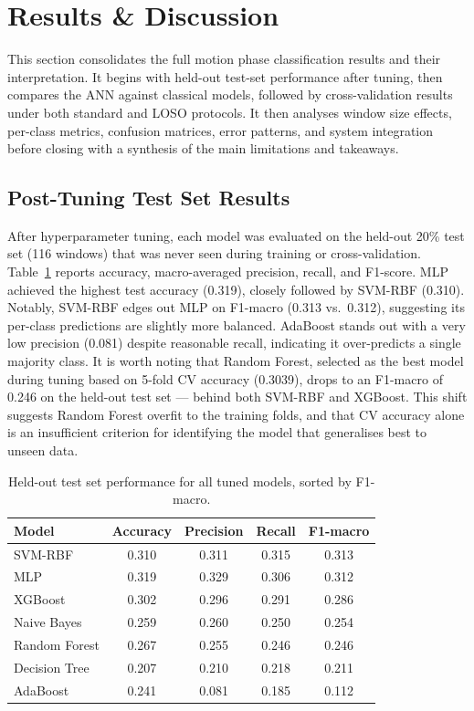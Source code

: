 \documentclass[12pt,a4paper]{cibb}
\begin{document}
\section{Results \& Discussion}
\label{sec:results_discussion}
This section consolidates the full motion phase classification results and their interpretation. It begins with held-out test-set performance after tuning, then compares the ANN against classical models, followed by cross-validation results under both standard and LOSO protocols. It then analyses window size effects, per-class metrics, confusion matrices, error patterns, and system integration before closing with a synthesis of the main limitations and takeaways.

\subsection{Post-Tuning Test Set Results}
After hyperparameter tuning, each model was evaluated on the held-out 20\% test set (116 windows) that was never seen during training or cross-validation. Table~\ref{tab:testresults} reports accuracy, macro-averaged precision, recall, and F1-score. MLP achieved the highest test accuracy (0.319), closely followed by SVM-RBF (0.310). Notably, SVM-RBF edges out MLP on F1-macro (0.313 vs.\ 0.312), suggesting its per-class predictions are slightly more balanced. AdaBoost stands out with a very low precision (0.081) despite reasonable recall, indicating it over-predicts a single majority class. It is worth noting that Random Forest, selected as the best model during tuning based on 5-fold CV accuracy (0.3039), drops to an F1-macro of 0.246 on the held-out test set — behind both SVM-RBF and XGBoost. This shift suggests Random Forest overfit to the training folds, and that CV accuracy alone is an insufficient criterion for identifying the model that generalises best to unseen data.

\begin{table}[H]
\centering
\small
\begin{tabular}{lcccc}
\toprule
\textbf{Model} & \textbf{Accuracy} & \textbf{Precision} & \textbf{Recall} & \textbf{F1-macro} \\
\midrule
\rowcolor{LightBlue} SVM-RBF       & 0.310 & 0.311 & 0.315 & 0.313 \\
MLP           & 0.319 & 0.329 & 0.306 & 0.312 \\
\rowcolor{LightBlue} XGBoost       & 0.302 & 0.296 & 0.291 & 0.286 \\
Naive Bayes   & 0.259 & 0.260 & 0.250 & 0.254 \\
\rowcolor{LightBlue} Random Forest & 0.267 & 0.255 & 0.246 & 0.246 \\
Decision Tree & 0.207 & 0.210 & 0.218 & 0.211 \\
\rowcolor{LightBlue} AdaBoost      & 0.241 & 0.081 & 0.185 & 0.112 \\
\bottomrule
\end{tabular}
\caption{Held-out test set performance for all tuned models, sorted by F1-macro.\label{tab:testresults}}
\end{table}
\end{document}
